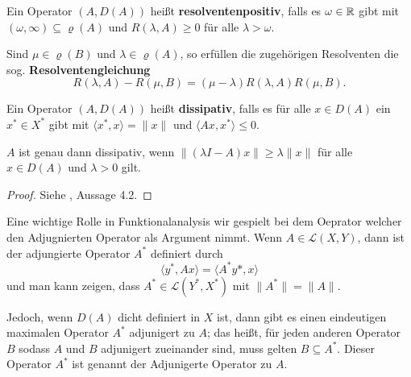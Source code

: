 \par
Ein Operator $(A, D(A))$ heißt \textbf{resolventenpositiv}, falls es $\omega\in\mathbb{R}$ gibt mit $(\omega, \infty)\subseteq\varrho (A)$ und $R(\lambda, A)\geq0$ für alle $\lambda > \omega$.

\par
Sind $\mu \in\varrho(B)$ und $\lambda\in\varrho(A)$, so erfüllen die zugehörigen Resolventen die sog. \textbf{Resolventengleichung} 
\begin{equation*}
R(\lambda, A)-R(\mu, B)=(\mu-\lambda)R(\lambda, A) R(\mu, B).
\end{equation*}

Ein Operator $(A, D(A))$ heißt \textbf{dissipativ}, falls es für alle $x\in D(A)$ ein $x^*\in X^*$ gibt mit $\langle x^*, x\rangle = \|x\|$ und $\langle Ax, x^*\rangle \leq 0$.

\begin{prop}\label{Charakterisierung der Dissipativität}
$A$ ist genau dann dissipativ, wenn $\|(\lambda I- A)x\|\geq \lambda \|x\|$ für alle $x\in D(A)$ und $\lambda >0$ gilt.
\end{prop} 

\begin{proof}
Siehe  \cite{pazy_1983}, Aussage 4.2.
\end{proof}




Eine wichtige Rolle in Funktionalanalysis wir gespielt bei dem Oeprator welcher den Adjugnierten Operator als Argument nimmt. Wenn $A\in\mathcal L(X,Y)$, dann ist der adjungierte Operator $A^*$ definiert durch
\begin{equation*}
\langle y^*, Ax\rangle =\langle A^*y*, x\rangle
\end{equation*}
und man kann zeigen, dass $A^*\in\mathcal L(Y^*, X^*)$ mit $\|A^*\|=\|A\|$.

\par 
Jedoch, wenn $D(A)$ dicht definiert in $X$ ist, dann gibt es einen eindeutigen maximalen Operator $A^*$ adjunigert zu $A$; das heißt, für jeden anderen Operator $B$ sodass $A$ und $B$ adjunigert zueinander sind, muss gelten $B\subseteq A^*$.  Dieser Operator $A^*$  ist genannt der Adjunigerte Operator zu $A$.


